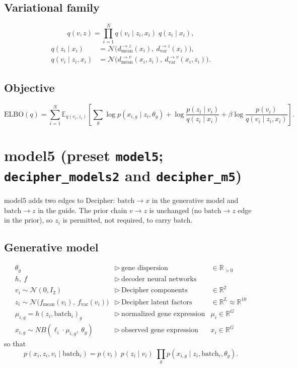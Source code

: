 \documentclass{article}
\newcommand{\batch}{\mathrm{batch}}
\begin{document}
\subsection{Variational family}
\[
q(v, z) = \prod_{i=1}^{N} q(v_i \mid z_i, x_i)\; q(z_i \mid x_i),
\]
\begin{align*}
q(z_i \mid x_i) &= \mathcal{N}\big(d^{\to z}_{\mathrm{mean}}(x_i),\ d^{\to z}_{\mathrm{var}}(x_i)\big), \\
q(v_i \mid z_i, x_i) &= \mathcal{N}\big(d^{\to v}_{\mathrm{mean}}(x_i, z_i),\ d^{\to v}_{\mathrm{var}}(x_i, z_i)\big).
\end{align*}

\subsection{Objective}
\[
\mathrm{ELBO}(q) = \sum_{i=1}^{N} \mathbb{E}_{q(v_i, z_i)}\!\left[
\sum_g \log p(x_{i,g} \mid z_i, \theta_g)
+ \log \frac{p(z_i \mid v_i)}{q(z_i \mid x_i)}
+ \beta \log \frac{p(v_i)}{q(v_i \mid z_i, x_i)}
\right].
\]

\section{model5 (preset \texttt{model5}; \texttt{decipher\_models2} and \texttt{decipher\_m5})}

model5 adds two edges to Decipher: $\batch \to x$ in the generative model and
$\batch \to z$ in the guide. The prior chain $v \to z$ is unchanged (no $\batch \to z$ edge in
the prior), so $z_i$ is permitted, not required, to carry batch.

\subsection{Generative model}
\[
\begin{array}{lll}
\theta_g & \triangleright\ \text{gene dispersion} & \in \mathbb{R}_{>0} \\
h,\ f & \triangleright\ \text{decoder neural networks} & \\
\hline
v_i \sim \mathcal{N}(0, I_2) & \triangleright\ \text{Decipher components} & \in \mathbb{R}^2 \\
z_i \sim \mathcal{N}\big(f_{\mathrm{mean}}(v_i),\ f_{\mathrm{var}}(v_i)\big)
  & \triangleright\ \text{Decipher latent factors} & \in \mathbb{R}^L \approx \mathbb{R}^{10} \\
\mu_{i,g} = h(z_i, \batch_i)_g & \triangleright\ \text{normalized gene expression} & \mu_i \in \mathbb{R}^G \\
x_{i,g} \sim NB(\ell_i \cdot \mu_{i,g},\ \theta_g) & \triangleright\ \text{observed gene expression} & x_i \in \mathbb{R}^G
\end{array}
\]
so that
\[
p(x_i, z_i, v_i \mid \batch_i) = p(v_i)\; p(z_i \mid v_i)\; \prod_g p(x_{i,g} \mid z_i, \batch_i, \theta_g).
\]
\end{document}
